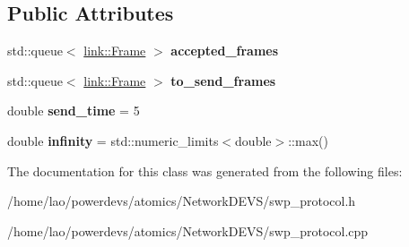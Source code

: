 \subsection*{Public Attributes}
\begin{DoxyCompactItemize}
\item 
std\+::queue$<$ \hyperlink{structlink_1_1Frame}{link\+::\+Frame} $>$ {\bfseries accepted\+\_\+frames}\hypertarget{classswp__protocol_a6ca21ef352c5c0386941af7ff47f889c}{}\label{classswp__protocol_a6ca21ef352c5c0386941af7ff47f889c}

\item 
std\+::queue$<$ \hyperlink{structlink_1_1Frame}{link\+::\+Frame} $>$ {\bfseries to\+\_\+send\+\_\+frames}\hypertarget{classswp__protocol_a83ea71f30f8d84f1248a48615ec3e869}{}\label{classswp__protocol_a83ea71f30f8d84f1248a48615ec3e869}

\item 
double {\bfseries send\+\_\+time} = 5\hypertarget{classswp__protocol_a03c28f33ff015cccdccf7f082e7cd981}{}\label{classswp__protocol_a03c28f33ff015cccdccf7f082e7cd981}

\item 
double {\bfseries infinity} = std\+::numeric\+\_\+limits$<$double$>$\+::max()\hypertarget{classswp__protocol_a267d11a0dbb19b5699670232d802c93c}{}\label{classswp__protocol_a267d11a0dbb19b5699670232d802c93c}

\end{DoxyCompactItemize}


The documentation for this class was generated from the following files\+:\begin{DoxyCompactItemize}
\item 
/home/lao/powerdevs/atomics/\+Network\+D\+E\+V\+S/swp\+\_\+protocol.\+h\item 
/home/lao/powerdevs/atomics/\+Network\+D\+E\+V\+S/swp\+\_\+protocol.\+cpp\end{DoxyCompactItemize}
